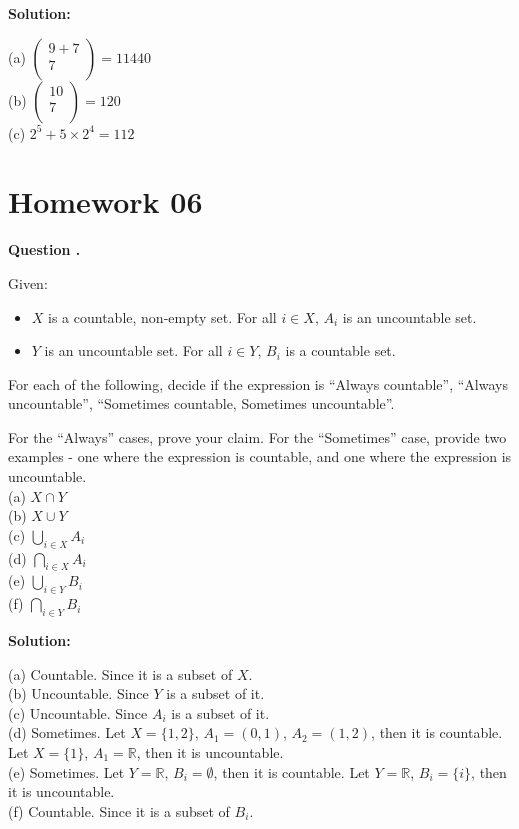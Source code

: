 \documentclass[12pt]{article}
\newcounter{questionnumber}
\newenvironment{question}[1][]{\stepcounter{questionnumber}\par\noindent\textbf{Question \thequestionnumber. #1}\par}{\par}
\newenvironment{solution}{\par\noindent\textbf{Solution:}\par}{\par\vspace{1em}}
\begin{document}
\begin{solution}
    \noindent
    (a) $\left( \begin{array}{c}
	9+7\\
    7\\
    \end{array} \right) =11440$\\
    (b) $\left( \begin{array}{c}
	10\\
	7\\
    \end{array} \right) =120$\\
    (c) $2^5+5\times 2^4=112$
\end{solution}
\section{Homework 06}
\begin{question}
    Given:
    \begin{itemize}
    \item $X$ is a countable, non-empty set. For all $i \in X$, $A_i$ is an uncountable set.
    \item $Y$ is an uncountable set. For all $i \in Y$, $B_i$ is a countable set.
    \end{itemize}

    For each of the following, decide if the expression is ``Always countable'', ``Always uncountable'', ``Sometimes countable, Sometimes uncountable''.

    For the ``Always'' cases, prove your claim. For the ``Sometimes'' case, provide two examples - one where the expression is countable, and one where the expression is uncountable.\\
    (a) $X \cap Y$\\
    (b) $X \cup Y$\\
    (c) $\bigcup_{i \in X} A_i$\\
    (d) $\bigcap_{i \in X} A_i$\\
    (e) $\bigcup_{i \in Y} B_i$\\
    (f) $\bigcap_{i \in Y} B_i$
\end{question}
\begin{solution}
    \noindent
    (a) Countable. Since it is a subset of $X$.\\
    (b) Uncountable. Since $Y$ is a subset of it.\\
    (c) Uncountable. Since $A_i$ is a subset of it.\\
    (d) Sometimes. Let $X=\{1,2\}$, $A_1=(0,1)$, $A_2=(1,2)$, then it is countable.
    Let $X=\{1\}$, $A_1=\mathbb{R}$, then it is uncountable.\\
    (e) Sometimes. Let $Y=\mathbb{R}$, $B_i=\emptyset$, then it is countable.
    Let $Y=\mathbb{R}$, $B_i=\{i\}$, then it is uncountable.\\
    (f) Countable. Since it is a subset of $B_i$.
\end{solution}
\end{document}
